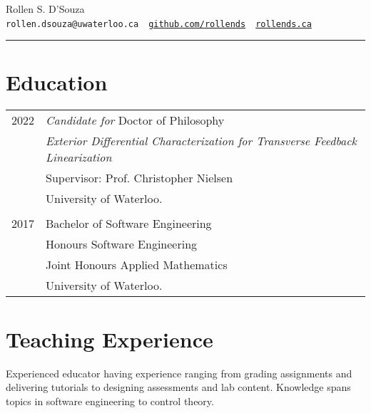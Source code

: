 \documentclass[oneside, 10pt]{memoir}
\begin{document}
\newcommand{\entryGeneral}[4]{
    \textbf{#2} \sourceatright{#1}
    \emph{#3}
    \begin{adjustwidth}{1em}{0em}
        #4
    \end{adjustwidth}
    \hfill
}

\newcommand{\entrySimple}[3]{
    \textbf{#2} \sourceatright{#1}
    \begin{adjustwidth}{1em}{0em}
        #3
    \end{adjustwidth}
    \hfill
}

%
\LARGE{{Rollen S. D'Souza}}\\
\small{\texttt{rollen.dsouza@uwaterloo.ca}~\textbullet~\href{https://github.com/rollends}{\texttt{github.com/rollends}}~\textbullet~\href{https://rollends.ca}{\texttt{rollends.ca}} }\\
\rule{\linewidth}{0.4pt}

\section*{Education}

\begin{tabular}{ll}
    {2022}
        & \emph{Candidate for} Doctor of Philosophy\\
        & \emph{Exterior Differential Characterization for Transverse Feedback Linearization}\\
        & Supervisor: Prof. Christopher Nielsen\\
        & University of Waterloo.\\
        & \\
    {2017}
        & Bachelor of Software Engineering\\
        & Honours Software Engineering\\
        & Joint Honours Applied Mathematics\\
        & University of Waterloo.
\end{tabular}

\section*{Teaching Experience}
Experienced educator having experience ranging from grading assignments and delivering tutorials to designing assessments and lab content.
Knowledge spans topics in software engineering to control theory.
\end{document}
